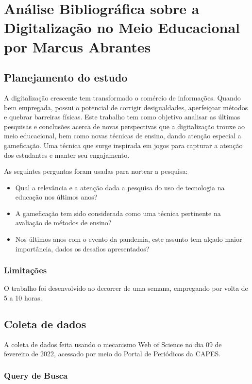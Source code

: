 \chapter{Análise Bibliográfica sobre a Digitalização no Meio Educacional por Marcus Abrantes \label{chap:bibliometria:MarcusABR}}

\section{Planejamento do estudo}

A digitalização crescente tem transformado o comércio de informações. Quando bem empregada, possui o potencial de corrigir desigualdades, aperfeiçoar métodos e quebrar barreiras físicas. Este trabalho tem como objetivo analisar as últimas pesquisas e conclusões acerca de novas perspectivas que a digitalização trouxe ao meio educacional, bem como novas técnicas de ensino, dando atenção especial a gameficação. Uma técnica que surge inspirada em jogos para capturar a atenção dos estudantes e manter seu engajamento.

As seguintes perguntas foram usadas para nortear a pesquisa:
 
\begin{itemize}
    \item Qual a relevância e a atenção dada a pesquisa do uso de tecnologia na educação nos últimos anos?
    \item A gameficação tem sido considerada como uma técnica pertinente na avaliação de métodos de ensino?
    \item Nos últimos anos com o evento da pandemia, este assunto tem alçado maior importância, dados os desafios apresentados?
\end{itemize}

\subsection{Limitações} O trabalho foi desenvolvido ao decorrer de uma semana, empregando por volta de 5 a 10 horas.

\section{Coleta de dados}

A coleta de dados feita usando o mecanismo Web of Science no dia 09 de fevereiro de 2022, acessado por meio do Portal de Periódicos da CAPES.

\subsection{Query de Busca}

